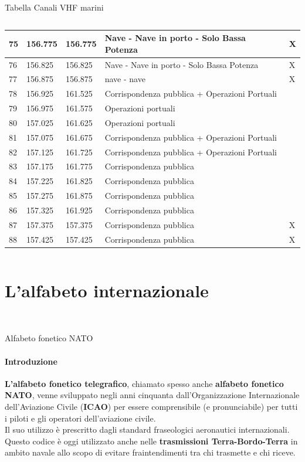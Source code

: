 \documentclass[aspectratio=169]{beamer}
\begin{document}
\begin{frame}{Tabella Canali VHF marini}
\begin{columns}
{\begin{tabular}{|l|l|l|l|l|}
		75 & 156.775 & 156.775 & Nave - Nave in porto - Solo Bassa Potenza & X \\ \hline
		76 & 156.825 & 156.825 & Nave - Nave in porto - Solo Bassa Potenza & X \\ \hline
		77 & 156.875 & 156.875 & nave - nave & X \\ \hline
		78 & 156.925 & 161.525 & Corrispondenza pubblica + Operazioni Portuali &\\ \hline
		79 & 156.975 & 161.575 & Operazioni portuali &\\ \hline
		80 & 157.025 & 161.625 & Operazioni portuali &\\ \hline
		81 & 157.075 & 161.675 & Corrispondenza pubblica + Operazioni Portuali &\\ \hline
		82 & 157.125 & 161.725 & Corrispondenza pubblica + Operazioni Portuali &\\ \hline
		83 & 157.175 & 161.775 & Corrispondenza pubblica &\\ \hline
		84 & 157.225 & 161.825 & Corrispondenza pubblica &\\ \hline
		85 & 157.275 & 161.875 & Corrispondenza pubblica &\\ \hline
		86 & 157.325 & 161.925 & Corrispondenza pubblica &\\ \hline
		87 & 157.375 & 157.375 & Corrispondenza pubblica & X \\ \hline
		88 & 157.425 & 157.425 & Corrispondenza pubblica & X \\ \hline
	\end{tabular}}
	\end{columns}
\end{frame}

\section{L'alfabeto internazionale}
\begin{frame}
	\\
\end{frame}

\begin{frame}{Alfabeto fonetico NATO}
	\framesubtitle{Introduzione}
	\textbf{L'alfabeto fonetico telegrafico}, chiamato spesso anche \textbf{alfabeto fonetico NATO}, venne sviluppato negli anni cinquanta dall'Organizzazione Internazionale dell'Aviazione Civile (\textbf{ICAO}) per essere comprensibile (e pronunciabile) per tutti i piloti e gli operatori dell'aviazione civile.\\
	Il suo utilizzo è prescritto dagli standard fraseologici aeronautici internazionali.\\
	Questo codice è oggi utilizzato anche nelle \textbf{trasmissioni Terra-Bordo-Terra} in ambito navale allo scopo di evitare fraintendimenti tra chi trasmette e chi riceve.\\
\end{frame}
\end{document}
